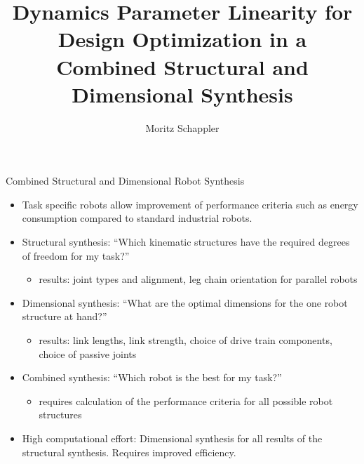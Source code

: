\documentclass[c]{beamer}
\author[moritz.schappler@imes.uni-hannover.de]{Moritz Schappler}
\title{Dynamics Parameter Linearity for Design Optimization in a Combined Structural and Dimensional Synthesis}
\institute{Institute of Mechatronic Systems}
\begin{document}
\begin{frame}
\begin{block}{Combined Structural and Dimensional Robot Synthesis}
\parbox{\linewidth}{
\begin{multicols}{2}
\begin{itemize}
    \item Task specific robots allow improvement of performance criteria such as energy consumption compared to standard industrial robots.
    \item Structural synthesis: ``Which kinematic structures have the required degrees of freedom for my task?'' 
    \begin{itemize}
    \item results: joint types and alignment, leg chain orientation for parallel robots
    \end{itemize}
    \item Dimensional synthesis: ``What are the optimal dimensions for the one robot structure at hand?'' 
    \begin{itemize}
        \item results: link lengths, link strength, choice of drive train components, choice of passive joints
    \end{itemize}
    \item Combined synthesis: ``Which robot is the best for my task?''
    \begin{itemize}
        \item requires calculation of the performance criteria for all possible robot structures
    \end{itemize}
    \item High computational effort: Dimensional synthesis for all results of the structural synthesis. Requires improved efficiency.
\end{itemize}

\begin{figure}[t]
    \centering
	
\end{figure}



\end{multicols}}
\end{block}
\end{frame}
\end{document}

